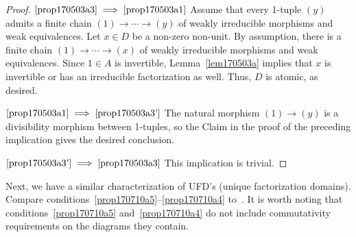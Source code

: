 \documentclass[reqno]{amsart}
\theoremstyle{plain}
\theoremstyle{definition}
\numberwithin{equation}{lem}
\begin{document}
\begin{proof}
$\eqref{prop170503a3}\implies\eqref{prop170503a1}$
Assume that every 1-tuple 
$(y)$
admits a finite chain
$(1)\to\cdots\to(y)$ of 
weakly
irreducible morphisms and weak equivalences.
Let $x\in D$ be a non-zero non-unit.
By assumption, there is a finite chain
$(1)\to\cdots\to(x)$ of 
weakly
irreducible morphisms and weak equivalences.
Since $1\in A$ is invertible, Lemma~\ref{lem170503a} 
implies that $x$ is  invertible or has an irreducible factorization as well.
Thus, $D$ is atomic, as desired.

$\eqref{prop170503a1}\implies\eqref{prop170503a3'}$
The natural morphism $(1)\to(y)$ is a divisibility morphism between 1-tuples, so the Claim in the proof of the preceding implication
gives the desired conclusion.

$\eqref{prop170503a3'}\implies\eqref{prop170503a3}$
This implication is trivial.
\end{proof}

Next, we have a similar characterization of 
UFD's (unique factorization domains).
Compare 
conditions~\eqref{prop170710a5}--\eqref{prop170710a4}
to~\cite[Theorem~5.1]{coykendall:idg}.
It is worth noting that 
conditions~\eqref{prop170710a5} and~\eqref{prop170710a4}
do not include commutativity requirements on the diagrams they contain.
\end{document}
